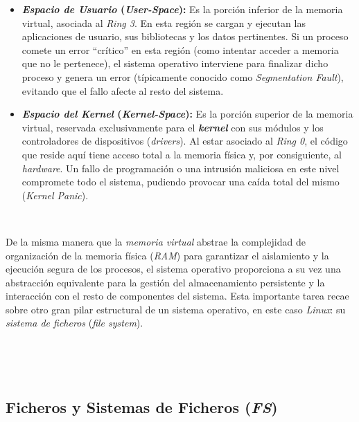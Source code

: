 \begin{itemize}
    \item \textbf{\textit{Espacio de Usuario} (\textit{User-Space}):} Es la porción inferior de la memoria virtual, asociada al \textit{Ring 3}. En esta región se cargan y ejecutan las aplicaciones de usuario, sus bibliotecas y los datos pertinentes.
    Si un proceso comete un error ``crítico'' en esta región (como intentar acceder a memoria que no le pertenece), el sistema operativo interviene para finalizar dicho proceso y genera un error (típicamente conocido como \textit{Segmentation Fault}), evitando que el fallo afecte al resto del sistema.
    \item \textbf{\textit{Espacio del Kernel} (\textit{Kernel-Space}):} Es la porción superior de la memoria virtual, reservada exclusivamente para el \textbf{\textit{kernel}} con sus módulos y los controladores de dispositivos (\textit{drivers}).
    Al estar asociado al \textit{Ring 0}, el código que reside aquí tiene acceso total a la memoria física y, por consiguiente, al \textit{hardware}. Un fallo de programación o una intrusión maliciosa en este nivel compromete todo el sistema, pudiendo provocar una caída total del mismo (\textit{Kernel Panic}).
\end{itemize}

\

De la misma manera que la \textit{memoria virtual} abstrae la complejidad de organización de la memoria física (\textit{RAM}) para garantizar el aislamiento y la ejecución segura de los procesos,
el sistema operativo proporciona a su vez una abstracción equivalente para la gestión del almacenamiento persistente y la interacción con el resto de componentes del sistema.
Esta importante tarea recae sobre otro gran pilar estructural de un sistema operativo, en este caso \textit{Linux}: su \textit{sistema de ficheros} (\textit{file system}).

\

\

\subsection{Ficheros y Sistemas de Ficheros (\textit{FS})}
\label{sec:fs}

